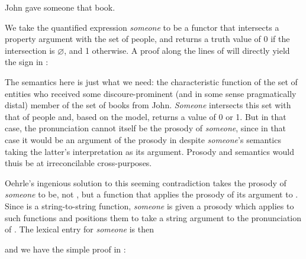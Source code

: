 \documentclass[output=paper,colorlinks,citecolor=brown]{langscibook}
\begin{document}
\begin{exe}
 \ex\label{someone}
  John gave someone that book.
\end{exe}
We take the quantified expression \textit{someone} to be a functor that
intersects a property argument with the set of people, and returns a
truth value of 0 if the intersection is $\varnothing$, and 1
otherwise. A proof along the lines of  will directly yield the
sign in :

\begin{exe}
 \ex\label{gaveTerm}
\end{exe}
The semantics here is just what we need: the characteristic function
of the set of entities who received some discoure-prominent (and in
some sense pragmatically distal) member of the set of books from
John. \textit{Someone} intersects this set with that of people and, based on
the model, returns a value of 0 or 1. But in that case, the pronunciation
 cannot itself be the prosody of \textit{someone}, since in that
case it would be an argument of the prosody in  despite
\textit{someone}'s semantics taking the latter's
interpretation as its argument. Prosody and semantics would thuis be at
irreconcilable cross-purposes.

Oehrle's ingenious solution to this seeming contradiction takes the
prosody of \textit{someone} to be, not , but a function that
applies the prosody of its  argument to . Since
 is a string-to-string
function, \textit{someone} is given a prosody which applies to such functions
and positions them to take a string argument  to the
pronunciation of . The lexical entry for \textit{someone} is then

\begin{exe}
 \ex\label{someoneEntry}
\end{exe}
and we have the simple proof in :
\end{document}
